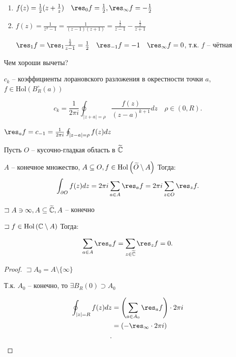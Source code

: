 \begin{example}
    \begin{enumerate}
        \item $f(z) = \frac{1}{2}(z + \frac{1}{z})\quad \res_0f = \frac{1}{2}, \res_{\infty }f = -\frac{1}{2}$
        \item $f(z) = \frac{1}{z^2 - 1} = \frac{1}{(z-1)(z+1)} = \frac{\frac{1}{2}}{z - 1} - \frac{\frac{1}{2}}{z+1}$

        $\res_1f = \res_1 \frac{\frac{1}{2}}{z - 1} = \frac{1}{2}\quad \res_{-1}f = -1\quad \res_{\infty }f = 0$, т.к. $f$ -- чётная
    \end{enumerate}
\end{example}

\begin{note}
    Чем хороши вычеты?
\end{note}

$c_k$ -- коэффициенты лорановского разложения в окрестности точки $a$, $f\in \mathrm{Hol}(B_R^\circ(a))$

\[
    c_k = \frac{1}{2\pi i} \oint _{|z+a| = \rho} \frac{f(z)}{(z-a)^{k+1}}dz\quad \rho\in(0,R)
.\]

$\res_af = c_{-1} = \frac{1}{2\pi i} \oint _{|z-a| = \rho}f(z)dz$

\begin{theorem}

    Пусть $O$ -- кусочно-гладкая область в $\widetilde{\mathbb{C}}$

    $A$ -- конечное множество, $A\subseteq O, f\in \mathrm{Hol}\left( \widetilde{O} \setminus A \right) $ Тогда:
    \[
    \int_{\partial O}f(z)dz = 2\pi i \sum_{a\in A}\res_a f = 2\pi i \sum_{z\in O}\res_zf
    .\]
\end{theorem}

\begin{theorem}


    $\sqsupset A\ni \infty , A\subseteq \widetilde{\mathbb{C}}, A$ -- конечно

    $\sqsupset f\in \mathrm{Hol}\left( \mathbb{C} \setminus A \right) $ Тогда:

    \[
    \sum_{a\in A}\res_af = \sum_{z\in \tl \C}\res_zf = 0
    .\]
\end{theorem}
\begin{proof}
    $\sqsupset A_0 = A \setminus \{\infty \}$

    Т.к. $A_0$ -- конечно, то $\exists B_R(0) \supset A_0$

    \begin{align*}
        \oint_{|z| = R} f(z)dz &= \left( \sum_{a\in A_0} \res_af \right) \cdot 2\pi i  \\
        &= \left( -\res_{\infty }\cdot 2\pi i \right)  \\
    .\end{align*}
\end{proof}

